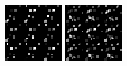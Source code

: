     \begin{figure}[h]
        \centering
        \begin{minipage}{.3\textwidth}
            \centering
            \includegraphics[width=.75\columnwidth]{chapter3/figures/image_manifolds/squares/10.png}
        \end{minipage}
        \begin{minipage}{.3\textwidth}
            \centering
            \includegraphics[width=.75\columnwidth]{chapter3/figures/image_manifolds/squares/20.png}
        \end{minipage}
        \begin{minipage}{.3\textwidth}
            \centering

\end{minipage}
\end{figure}
